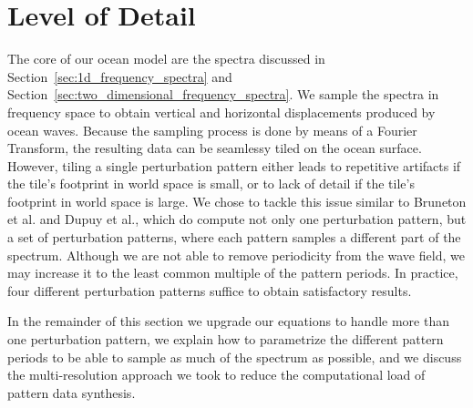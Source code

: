 \section{Level of Detail}
\label{sec:level_of_detail}
The core of our ocean model are the spectra discussed in 
Section~\ref{sec:1d_frequency_spectra} and 
Section~\ref{sec:two_dimensional_frequency_spectra}. We sample the spectra in 
frequency space to obtain vertical and horizontal displacements produced by 
ocean waves. Because the sampling process is done by means of a Fourier 
Transform, the resulting data can be seamlessy tiled on the ocean surface. 
However, tiling a single perturbation pattern either leads to repetitive 
artifacts if the tile's footprint in world space is small, or to lack of detail 
if the tile's footprint in world space is large. We chose to tackle this 
issue similar to Bruneton et al.\cite{misc:oceanlightingfft} and Dupuy et 
al.\cite{article:whitecaps}, which do compute not only one perturbation 
pattern, but a set of perturbation patterns, where each pattern samples a 
different part of the spectrum. Although we are not able to remove periodicity 
from the wave field, we may increase it to the least common multiple of the
pattern periods. In practice, four different perturbation patterns suffice to
obtain satisfactory results.

In the remainder of this section we upgrade our equations to handle more than
one perturbation pattern, we explain how to parametrize the different pattern
periods to be able to sample as much of the spectrum as possible, and we discuss
the multi-resolution approach we took to reduce the computational load of pattern
data synthesis.
